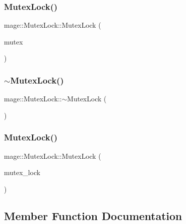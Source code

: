 \subsubsection{\texorpdfstring{Mutex\+Lock()}{MutexLock()}\hspace{0.1cm}{\footnotesize\ttfamily [1/2]}}
{\footnotesize\ttfamily mage\+::\+Mutex\+Lock\+::\+Mutex\+Lock (\begin{DoxyParamCaption}\item[{\hyperlink{classmage_1_1_mutex}{Mutex} \&}]{mutex }\end{DoxyParamCaption})}

\hypertarget{structmage_1_1_mutex_lock_a2631e8878646b2d25b136b6adb55d553}{}\label{structmage_1_1_mutex_lock_a2631e8878646b2d25b136b6adb55d553} 
\subsubsection{\texorpdfstring{$\sim$\+Mutex\+Lock()}{~MutexLock()}}
{\footnotesize\ttfamily mage\+::\+Mutex\+Lock\+::$\sim$\+Mutex\+Lock (\begin{DoxyParamCaption}{ }\end{DoxyParamCaption})}

\hypertarget{structmage_1_1_mutex_lock_a9bfeb564ac4563e10d8fe569870d0e18}{}\label{structmage_1_1_mutex_lock_a9bfeb564ac4563e10d8fe569870d0e18} 
\subsubsection{\texorpdfstring{Mutex\+Lock()}{MutexLock()}\hspace{0.1cm}{\footnotesize\ttfamily [2/2]}}
{\footnotesize\ttfamily mage\+::\+Mutex\+Lock\+::\+Mutex\+Lock (\begin{DoxyParamCaption}\item[{const \hyperlink{structmage_1_1_mutex_lock}{Mutex\+Lock} \&}]{mutex\+\_\+lock }\end{DoxyParamCaption})\hspace{0.3cm}{\ttfamily [private]}}



\subsection{Member Function Documentation}
\hypertarget{structmage_1_1_mutex_lock_ac625ca4d598180b01f58e81062462ca8}{}\label{structmage_1_1_mutex_lock_ac625ca4d598180b01f58e81062462ca8} 
